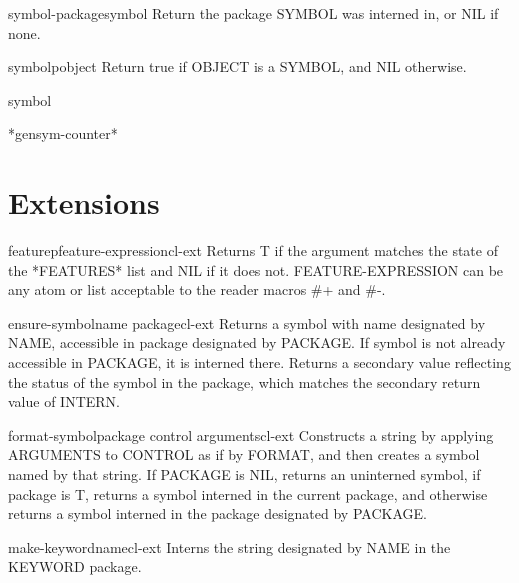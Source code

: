 \begin{function}{symbol-package}{symbol}{}{}
  Return the package SYMBOL was interned in, or NIL if none.
\end{function}

\begin{function}{symbolp}{object}{}{}
  Return true if OBJECT is a SYMBOL, and NIL otherwise.
\end{function}

\begin{class}{symbol}{}{}{}
  
\end{class}

\begin{variable}{*gensym-counter*}{}{}{}
  
\end{variable}

\section{Extensions}
\label{sec:extensions}

\begin{function}{featurep}{feature-expression}{cl-ext}{}
  Returns T if the argument matches the state of the *FEATURES*
list and NIL if it does not. FEATURE-EXPRESSION can be any atom
or list acceptable to the reader macros \#+ and \#-.
\end{function}

\begin{function}{ensure-symbol}{name \op package}{cl-ext}{}
  Returns a symbol with name designated by NAME, accessible in package
designated by PACKAGE. If symbol is not already accessible in PACKAGE, it is
interned there. Returns a secondary value reflecting the status of the symbol
in the package, which matches the secondary return value of INTERN.
\end{function}

\begin{function}{format-symbol}{package control \rest arguments}{cl-ext}{}
  Constructs a string by applying ARGUMENTS to CONTROL as if by FORMAT, and
then creates a symbol named by that string. If PACKAGE is NIL, returns an
uninterned symbol, if package is T, returns a symbol interned in the current
package, and otherwise returns a symbol interned in the package designated by
PACKAGE.
\end{function}

\begin{function}{make-keyword}{name}{cl-ext}{}
  Interns the string designated by NAME in the KEYWORD package.
\end{function}

